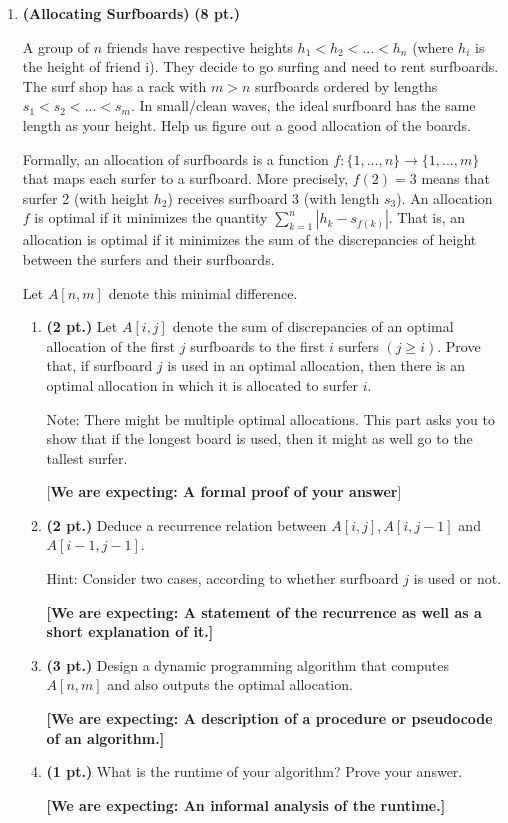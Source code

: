 \documentclass{article}
\begin{document}
\begin{enumerate}
  \newpage

  \item \textbf{(Allocating Surfboards)} \textbf{(8 pt.)}
  
    A group of $n$ friends have respective heights $h_1 < h_2 < ... < h_n$ (where
    $h_i$ is the height of friend i). They decide to go surfing and need to rent
    surfboards. The surf shop has a rack with $m > n$ surfboards ordered by
    lengths $s_1 < s_2 < ... < s_m$. In small/clean waves, the ideal surfboard has
    the same length as your height. Help us figure out a good allocation of the
    boards.

    Formally, an allocation of surfboards is a function
    $f : \{1, ..., n\} \rightarrow \{1, ..., m\}$ that maps each surfer to a
    surfboard. More precisely, $f(2) = 3$ means that surfer 2 (with height $h_2$)
    receives surfboard 3 (with length $s_3$). An allocation $f$ is optimal if it
    minimizes the quantity $\sum_{k=1}^n | h_k - s_{f(k)} |$. That is, an
    allocation is optimal if it minimizes the sum of the discrepancies of height
    between the surfers and their surfboards.

    Let $A[n, m]$ denote this minimal difference.

    \begin{enumerate}
      \item \textbf{(2 pt.)} Let $A[i, j]$ denote the sum of discrepancies of an
        optimal allocation of the first $j$ surfboards to the first $i$ surfers
        $(j \geq i)$. Prove that, if surfboard $j$ is used in an optimal
        allocation, then there is an optimal allocation in which it is allocated
        to surfer $i$.

        Note: There might be multiple optimal allocations. This part asks you to
        show that if the longest board is used, then it might as well go to the
        tallest surfer.

        [\textbf{We are expecting: A formal proof of your answer}]

      \item \textbf{(2 pt.)} Deduce a recurrence relation between
        $A[i, j], A[i, j - 1]$ and $A[i - 1, j - 1]$. 

        Hint: Consider two cases, according to whether surfboard $j$ is used or
        not.

        \textbf{[We are expecting: A statement of the recurrence as well as a
        short explanation of it.]}

      \item \textbf{(3 pt.)} Design a dynamic programming algorithm that computes
        $A[n, m]$ and also outputs the optimal allocation.

        \textbf{[We are expecting: A description of a procedure or pseudocode of
        an algorithm.]}
	
      \item \textbf{(1 pt.)} What is the runtime of your algorithm? Prove your
        answer.

        \textbf{[We are expecting: An informal analysis of the runtime.]}

    \end{enumerate}
\end{enumerate}
\end{document}

